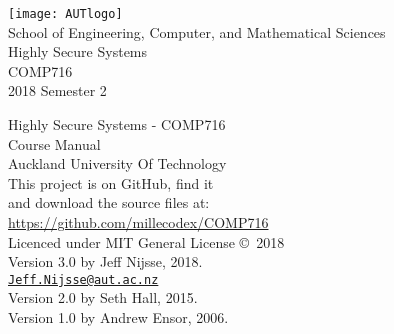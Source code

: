 \documentclass[a4paper,twoside]{book}
\begin{document}
 \frontmatter
 \begin{titlepage}
 	\begin{center}
 		
 		\texttt{[image: AUTlogo]}\\
 		{\vspace{2cm}}
 		{\Large School of Engineering, Computer, and Mathematical Sciences}
 		\vspace{3cm}\\
 		{\huge Highly Secure Systems}\\
 		\vspace{1cm}
 		{\huge COMP716} \\
 		\vspace{1cm}
 		{\huge 2018 Semester 2} \\
 		\vfill
 	\end{center}
 \end{titlepage}
 
 \clearpage\thispagestyle{empty}
   \vspace*{\fill}
 Highly Secure Systems - COMP716\\
 Course Manual\\
 Auckland University Of Technology\\
 
 This project is on GitHub, find it \\
 and download the source files at: \\
 \url{https://github.com/millecodex/COMP716} \\                            
                                                                      
 Licenced under MIT General License \copyright\, 2018 \\     
 
 Version 3.0 by Jeff Nijsse, 2018.\\
\href{mailto:Jeff.Nijsse@aut.ac.nz}{\texttt{Jeff.Nijsse@aut.ac.nz}}\\
 Version 2.0 by Seth Hall, 2015.\\
 Version 1.0 by Andrew Ensor, 2006.
 
 
    \tableofcontents

  \mainmatter
    
    
    
    
    
	

  \appendix
\end{document}
